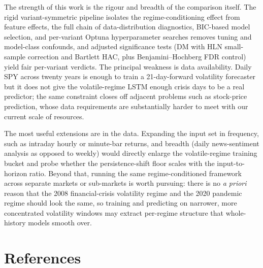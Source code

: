 \documentclass{article}
\begin{document}
The strength of this work is the rigour and breadth of the comparison itself. The rigid variant-symmetric pipeline isolates the regime-conditioning effect from feature effects, the full chain of data-distribution diagnostics, BIC-based model selection, and per-variant Optuna hyperparameter searches removes tuning and model-class confounds, and adjusted significance tests (DM with HLN small-sample correction and Bartlett HAC, plus Benjamini--Hochberg FDR control) yield fair per-variant verdicts. The principal weakness is data availability. Daily SPY across twenty years is enough to train a 21-day-forward volatility forecaster but it does not give the volatile-regime LSTM enough crisis days to be a real predictor; the same constraint closes off adjacent problems such as stock-price prediction, whose data requirements are substantially harder to meet with our current scale of resources.

The most useful extensions are in the data. Expanding the input set in frequency, such as intraday hourly or minute-bar returns, and breadth (daily news-sentiment analysis as opposed to weekly) would directly enlarge the volatile-regime training bucket and probe whether the persistence-shift floor scales with the input-to-horizon ratio. Beyond that, running the same regime-conditioned framework across separate markets or sub-markets is worth pursuing: there is no \emph{a priori} reason that the 2008 financial-crisis volatility regime and the 2020 pandemic regime should look the same, so training and predicting on narrower, more concentrated volatility windows may extract per-regime structure that whole-history models smooth over.


\section*{References}
\end{document}
